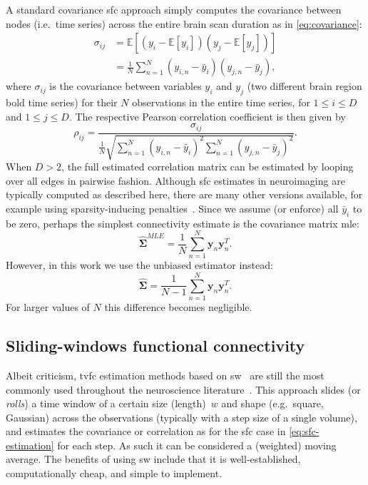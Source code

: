 A standard covariance \gls{sfc} approach simply computes the covariance between nodes (i.e.~time series) across the entire brain scan duration as in \cref{eq:covariance}:
\begin{equation}
  \begin{aligned}
    \sigma_{ij} & = \mathbb{E}[(y_i - \mathbb{E}[y_i])(y_j - \mathbb{E}[y_j])] \\ & = \frac{1}{N} \sum_{n=1}^N (y_{i,n} - \bar y_i)(y_{j,n} - \bar y_j),
  \end{aligned}
\end{equation}
where $\sigma_{ij}$ is the covariance between variables $y_i$ and $y_j$ (two different brain region \gls{bold} time series) for their $N$ observations in the entire time series, for $1 \leq i \leq D$ and $1 \leq j \leq D$.
The respective Pearson correlation coefficient is then given by
\begin{equation}
  \label{eq:sfc-estimation}
  \rho_{ij} = \frac{\sigma_{ij}}{\frac{1}{N} \sqrt{\sum_{n=1}^N (y_{i,n} - \bar y_i)^2 \sum_{n=1}^N (y_{j,n} - \bar y_j)^2}}.
\end{equation}
When $D > 2$, the full estimated correlation matrix can be estimated by looping over all edges in pairwise fashion.
Although \gls{sfc} estimates in neuroimaging are typically computed as described here, there are many other versions available, for example using sparsity-inducing penalties~\parencite{Foti2019}.
%
Since we assume (or enforce) all $\bar y_i$ to be zero, perhaps the simplest connectivity estimate is the covariance matrix \gls{mle}:
\begin{equation}
  \hat{\mathbf{\Sigma}}^{MLE} = \frac{1}{N} \sum_{n=1}^N \mathbf{y}_{n} \mathbf{y}_{n}^T.
\end{equation}
However, in this work we use the unbiased estimator instead:
\begin{equation}
  \hat{\mathbf{\Sigma}} = \frac{1}{N - 1} \sum_{n=1}^N \mathbf{y}_{n} \mathbf{y}_{n}^T.
\end{equation}
For larger values of $N$ this difference becomes negligible.

\subsection{Sliding-windows functional connectivity}
\label{subsec:sliding-windows-fc}

Albeit criticism, \gls{tvfc} estimation methods based on \gls{sw}~\parencite{Chang2010, Sakoglu2010, Allen2014, Shakil2016, Preti2017} are still the most commonly used throughout the neuroscience literature~\parencite{Lurie2020}.
%
This approach slides (or \emph{rolls}) a time window of a certain size (length)~$w$ and shape (e.g.~square, Gaussian) across the observations (typically with a step size of a single volume), and estimates the covariance or correlation as for the \gls{sfc} case in \cref{eq:sfc-estimation} for each step.
As such it can be considered a (weighted) moving average.
The benefits of using \gls{sw} include that it is well-established, computationally cheap, and simple to implement.

